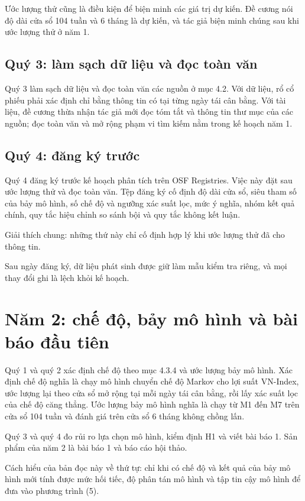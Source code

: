 Ước lượng thử cũng là điều kiện để biện minh các giá trị dự kiến. Đề cương nói độ dài cửa sổ 104 tuần và 6 tháng là dự kiến, và tác giả biện minh chúng sau khi ước lượng thử ở năm 1.

\subsection{Quý 3: làm sạch dữ liệu và đọc toàn văn}

Quý 3 làm sạch dữ liệu và đọc toàn văn các nguồn ở mục 4.2. Với dữ liệu, rổ cổ phiếu phải xác định chỉ bằng thông tin có tại từng ngày tái cân bằng. Với tài liệu, đề cương thừa nhận tác giả mới đọc tóm tắt và thông tin thư mục của các nguồn; đọc toàn văn và mở rộng phạm vi tìm kiếm nằm trong kế hoạch năm 1.

\subsection{Quý 4: đăng ký trước}

Quý 4 đăng ký trước kế hoạch phân tích trên OSF Registries. Việc này đặt sau ước lượng thử và đọc toàn văn. Tệp đăng ký cố định độ dài cửa sổ, siêu tham số của bảy mô hình, số chế độ và ngưỡng xác suất lọc, mức ý nghĩa, nhóm kết quả chính, quy tắc hiệu chỉnh so sánh bội và quy tắc không kết luận.

Giải thích chung: những thứ này chỉ cố định hợp lý khi ước lượng thử đã cho thông tin.

Sau ngày đăng ký, dữ liệu phát sinh được giữ làm mẫu kiểm tra riêng, và mọi thay đổi ghi là lệch khỏi kế hoạch.

\section{Năm 2: chế độ, bảy mô hình và bài báo đầu tiên}

Quý 1 và quý 2 xác định chế độ theo mục 4.3.4 và ước lượng bảy mô hình. Xác định chế độ nghĩa là chạy mô hình chuyển chế độ Markov cho lợi suất VN-Index, ước lượng lại theo cửa sổ mở rộng tại mỗi ngày tái cân bằng, rồi lấy xác suất lọc của chế độ căng thẳng. Ước lượng bảy mô hình nghĩa là chạy từ M1 đến M7 trên cửa sổ 104 tuần và đánh giá trên cửa sổ 6 tháng không chồng lấn.

Quý 3 và quý 4 đo rủi ro lựa chọn mô hình, kiểm định H1 và viết bài báo 1. Sản phẩm của năm 2 là bài báo 1 và báo cáo hội thảo.

Cách hiểu của bản đọc này về thứ tự: chỉ khi có chế độ và kết quả của bảy mô hình mới tính được mức hối tiếc, độ phân tán mô hình và tập tin cậy mô hình để đưa vào phương trình (5).

